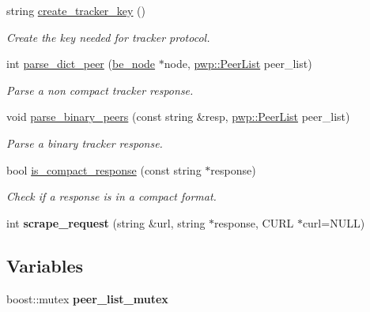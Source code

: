 \begin{DoxyCompactItemize}
string \hyperlink{namespacetracker_a722dfd0ec93e84bbbd448d2c9d6a9f1b}{create\+\_\+tracker\+\_\+key} ()
\begin{DoxyCompactList}\small\item\em Create the key needed for tracker protocol. \end{DoxyCompactList}\item 
int \hyperlink{namespacetracker_a38d52cf6dd86f2a26a719e285097c805}{parse\+\_\+dict\+\_\+peer} (\hyperlink{structbe__node}{be\+\_\+node} $\ast$node, \hyperlink{namespacepwp_ad07fa6df116b205302ad5ec172277184}{pwp\+::\+Peer\+List} peer\+\_\+list)
\begin{DoxyCompactList}\small\item\em Parse a non compact tracker response. \end{DoxyCompactList}\item 
void \hyperlink{namespacetracker_a237de4c8b0282af2d59cd5d0b7bfd1fd}{parse\+\_\+binary\+\_\+peers} (const string \&resp, \hyperlink{namespacepwp_ad07fa6df116b205302ad5ec172277184}{pwp\+::\+Peer\+List} peer\+\_\+list)
\begin{DoxyCompactList}\small\item\em Parse a binary tracker response. \end{DoxyCompactList}\item 
bool \hyperlink{namespacetracker_ae542bb4bf17f34b8cadc3a4ae2f5ced2}{is\+\_\+compact\+\_\+response} (const string $\ast$response)
\begin{DoxyCompactList}\small\item\em Check if a response is in a compact format. \end{DoxyCompactList}\item 
\mbox{\label{namespacetracker_a3426052cbc1ef8f22a629e4468cd70e6}} 
int {\bfseries scrape\+\_\+request} (string \&url, string $\ast$response, C\+U\+RL $\ast$curl=N\+U\+LL)
\end{DoxyCompactItemize}
\subsection*{Variables}
\begin{DoxyCompactItemize}
\item 
\mbox{\label{namespacetracker_a53fb7c4cde6ffdc06505609407c563ad}} 
boost\+::mutex {\bfseries peer\+\_\+list\+\_\+mutex}
\end{DoxyCompactItemize}


